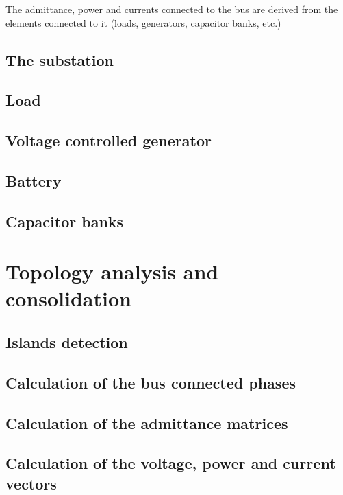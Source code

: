 \documentclass[a4paper,twoside]{tufte-book}
\begin{document}
The admittance, power and currents connected to the bus are derived from the elements connected to it (loads, generators, capacitor banks, etc.)

\section{The substation}




\section{Load}


\section{Voltage controlled generator}


\section{Battery}


\section{Capacitor banks}




\chapter{Topology analysis and consolidation}


\section{Islands detection}


\section{Calculation of the bus connected phases}


\section{Calculation of the admittance matrices}


\section{Calculation of the voltage, power and current vectors}
\end{document}
